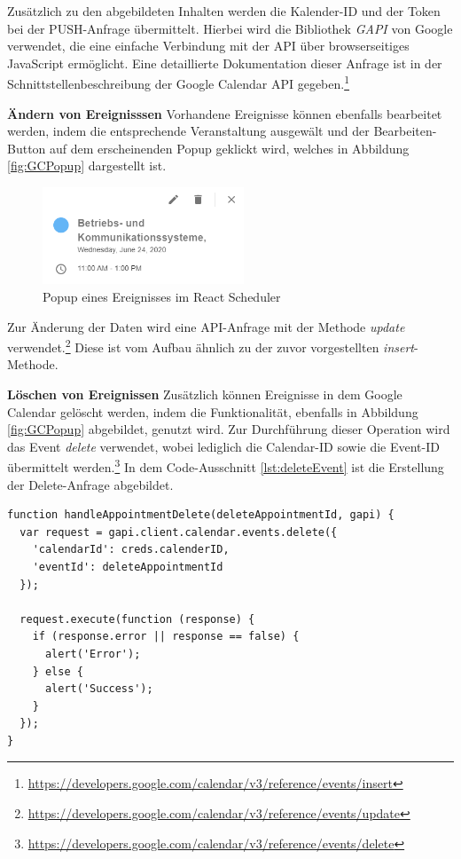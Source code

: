 Zusätzlich zu den abgebildeten Inhalten werden die Kalender-ID und der Token bei der PUSH-Anfrage übermittelt. Hierbei wird die Bibliothek \textit{GAPI} von Google verwendet, die eine einfache Verbindung mit der \ac{API} über browserseitiges JavaScript ermöglicht. 
Eine detaillierte Dokumentation dieser Anfrage ist in der Schnittstellenbeschreibung der Google Calendar \ac{API} gegeben.\footnote{\url{https://developers.google.com/calendar/v3/reference/events/insert}}

\textbf{Ändern von Ereignisssen}\newline
Vorhandene Ereignisse können ebenfalls bearbeitet werden, indem die entsprechende Veranstaltung ausgewält und der Bearbeiten-Button auf dem erscheinenden Popup geklickt wird, welches in Abbildung \vref{fig:GCPopup} dargestellt ist. 
\begin{figure}[H]
	\centering 
	\includegraphics[width=6cm]{img/FrontEnd/GCPopup.png}
	\caption[Popup eines Ereignisses im React Scheduler]{\label{fig:GCPopup}Popup eines Ereignisses im React Scheduler}
\end{figure}

Zur Änderung der Daten wird eine \ac{API}-Anfrage mit der Methode \textit{update} verwendet.\footnote{\url{https://developers.google.com/calendar/v3/reference/events/update}} 
Diese ist vom Aufbau ähnlich zu der zuvor vorgestellten \textit{insert}-Methode.

\textbf{Löschen von Ereignissen}\newline
Zusätzlich können Ereignisse in dem Google Calendar gelöscht werden, indem die Funktionalität, ebenfalls in Abbildung \vref{fig:GCPopup} abgebildet, genutzt wird. 
Zur Durchführung dieser Operation wird das Event \textit{delete} verwendet, wobei lediglich die Calendar-ID sowie die Event-ID übermittelt werden.\footnote{\url{https://developers.google.com/calendar/v3/reference/events/delete}}   
In dem Code-Ausschnitt \vref{lst:deleteEvent} ist die Erstellung der Delete-Anfrage abgebildet.

\lstset{language=JavaScript}
\begin{lstlisting}[caption={Anfrage zum Löschen eines Ereignisses}, label={lst:deleteEvent}]
function handleAppointmentDelete(deleteAppointmentId, gapi) {
  var request = gapi.client.calendar.events.delete({
    'calendarId': creds.calenderID,
    'eventId': deleteAppointmentId
  });

  request.execute(function (response) {
    if (response.error || response == false) {
      alert('Error');
    } else {
      alert('Success');
    }
  });
}
\end{lstlisting}

